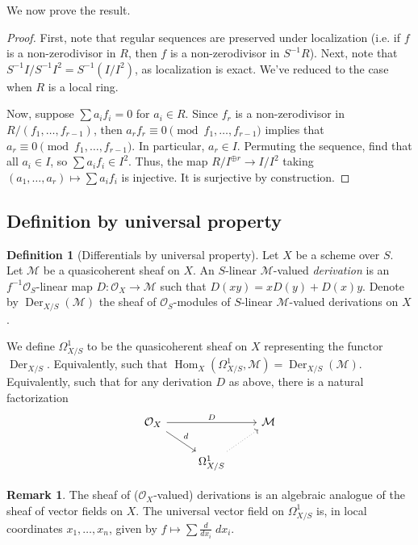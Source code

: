 \documentclass[10pt]{article}
\theoremstyle{definition}
\newtheorem{defn}[thm]{Definition}
\newtheorem{rmk}[thm]{Remark}
\DeclareMathOperator{\Hom}{Hom}
\DeclareMathOperator{\Der}{Der}
\newcommand{\OO}{\mathcal{O}}
\begin{document}
We now prove the result.
\begin{proof}
First, note that regular sequences are preserved under localization (i.e. if $f$ is a non-zerodivisor in $R$, then $f$ is a non-zerodivisor in $S^{-1}R$).  Next, note that $S^{-1}I/S^{-1}I^2 = S^{-1}(I/I^2)$, as localization is exact.  We've reduced to the case when $R$ is a local ring.

Now, suppose $\sum a_i f_i = 0$ for $a_i \in R$.  Since $f_r$ is a non-zerodivisor in $R/(f_1, \ldots, f_{r-1})$, then $a_r f_r \equiv 0 \pmod{f_1, \ldots, f_{r-1}}$ implies that $a_r \equiv 0 \pmod{f_1, \ldots, f_{r-1}}$.  In particular, $a_r \in I$.  Permuting the sequence, find that all $a_i \in I$, so $\sum a_i f_i \in I^2$.  Thus, the map $R/I^{\oplus r} \rightarrow I/I^2$ taking  $(a_1, \ldots, a_r) \mapsto \sum a_i f_i$ is injective.  It is surjective by construction.
\end{proof}


\subsection{Definition by universal property}

\begin{defn}[Differentials by universal property]
Let $X$ be a scheme over $S$.  Let $\mathcal{M}$ be a quasicoherent sheaf on $X$.  An $S$-linear $\mathcal{M}$-valued \emph{derivation} is an $f^{-1}\OO_S$-linear map $D: \OO_X \rightarrow \mathcal{M}$ such that $D(xy) = xD(y) + D(x)y$.  Denote by $\Der_{X/S}(\mathcal{M})$ the sheaf of $\OO_S$-modules of $S$-linear $\mathcal{M}$-valued derivations on $X$.

We define $\Omega^1_{X/S}$ to be the quasicoherent sheaf on $X$ representing the functor $\Der_{X/S}$.  Equivalently, such that $\Hom_X(\Omega^1_{X/S}, \mathcal{M}) = \Der_{X/S}(\mathcal{M})$.  Equivalently, such that for any derivation $D$ as above, there is a natural factorization
$$\begin{tikzcd}
\OO_X \arrow[dr, "d"] \arrow[rr, "D"] & & \mathcal{M} \\
& \Omega^1_{X/S} \arrow[ur, dotted] &
\end{tikzcd}$$
\end{defn}

\begin{rmk}
The sheaf of ($\OO_X$-valued) derivations is an algebraic analogue of the sheaf of vector fields on $X$.  The universal vector field on $\Omega^1_{X/S}$ is, in local coordinates $x_1, \ldots, x_n$, given by $f \mapsto \sum \frac{d}{dx_i} \; dx_i$.
\end{rmk}
\end{document}
